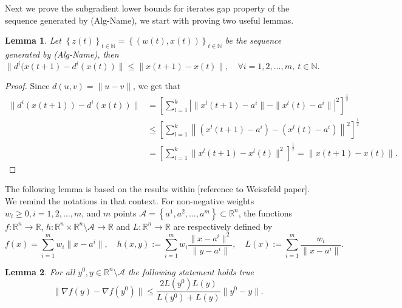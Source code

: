 \documentclass[11pt]{article}
\numberwithin{equation}{section}
\newtheorem{lemma}{Lemma}[proposition]
\def\abs#1{\left\lvert#1\right\rvert}
\begin{document}
Next we prove the subgradient lower bounds for iterates gap property of the sequence generated by (Alg-Name), we start with proving two useful lemmas.

\begin{lemma} \label{StateEq40}
Let $\left\lbrace z(t) \right\rbrace_{t \in \mathbb{N}} = \left\lbrace (w(t) , x(t)) \right\rbrace_{t \in \mathbb{N}}$ be the sequence generated by (Alg-Name), then 
\begin{equation*}
	\| d^i(x(t+1) - d^i(x(t)) \| \leq \| x(t+1) - x(t)\|, \quad \forall i=1, 2, \ldots ,m, \: t \in \mathbb{N} .
\end{equation*}
\end{lemma}

\begin{proof}
Since $d(u,v) = \| u-v \|$, we get that
\begin{equation*}
\begin{aligned}
	\|d^i(x(t+1)) - d^i(x(t))\| 
	&= \left[ \sum_{l=1}^{k} \abs{ \| x^l(t+1) - a^i\| - \|x^l(t) - a^i\| }^2 \right]^\frac{1}{2} \\
	&\leq \left[ \sum_{l=1}^{k}  \left\lVert \left( x^l(t+1) - a^i \right) - \left( x^l(t) - a^i\right) \right\rVert^2 \right]^\frac{1}{2} \\
	&= \left[ \sum_{l=1}^{k} \| x^l(t+1) - x^l(t) \|^2 \right]^\frac{1}{2} = \|x(t+1) - x(t)\| .
\end{aligned}
\end{equation*}
\end{proof}

The following lemma is based on the results within [reference to Weiszfeld paper]. We remind the notations in that context. For non-negative weights $w_i \geq 0, i=1,2, \ldots, m$, and $m$ points $\mathcal{A} = \left\lbrace a^1, a^2, \ldots, a^m \right\rbrace \subset \mathbb{R}^{n}$, the functions $f:\mathbb{R}^n \rightarrow \mathbb{R}$, $h:\mathbb{R}^n \times \mathbb{R}^n \setminus \mathcal{A} \rightarrow \mathbb{R}$ and $L:\mathbb{R}^n \rightarrow \mathbb{R}$ are respectively defined by
\begin{equation*}
	f(x)= \sum\limits_{i=1}^{m} w_i \|x - a^i\|, \quad h(x,y):=\sum\limits_{i=1}^{m} w_i \frac{\|x - a^i\|^2}{\|y - a^i\|} , \quad L(x):=\sum\limits_{i=1}^{m} \frac{w_i}{\|x - a^i\|} .
\end{equation*}

\begin{lemma} \label{StateEq41}
 For all $y^0,y \in \mathbb{R}^n \setminus \mathcal{A}$ the following statement holds true
\begin{equation*}
	\| \nabla f(y) - \nabla f(y^0) \| \leq \frac{2L(y^0)L(y)}{L(y^0)+L(y)} \|y^0 - y\|.
\end{equation*}
\end{lemma}
\end{document}
